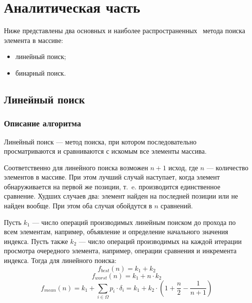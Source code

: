 \chapter{Аналитическая часть}

Ниже представлены два основных и наиболее распространенных~\cite{aa_lec} метода поиска элемента в массиве:
\begin{itemize}[label=---]
	\item линейный поиск;
	\item бинарный поиск.
\end{itemize}

\section{Линейный поиск}

\subsection{Описание алгоритма}

Линейный поиск --- метод поиска, при котором последовательно просматриваются и сравниваются с искомым все элементы массива.

Соответственно для линейного поиска возможен $n+1$ исход, где $n$ --- количество элементов в массиве. При этом лучший случай наступает, когда элемент обнаруживается на первой же позиции, т.~e. производится единственное сравнение. Худших случаев два: элемент найден на последней позиции или не найден вообще. При этом оба случая обойдутся в $n$ сравнений.

Пусть $k_1$ --- число операций производимых линейным поиском до прохода по всем элементам, например, объявление и определение начального значения индекса. Пусть также $k_2$ --- число операций производимых на каждой итерации просмотра очередного элемента, например, операции сравнения и инкремента индекса. Тогда для линейного поиска:
\begin{equation}
	\label{eq:lin_best_case}
	f_{best}(n) = k_1 + k_2
\end{equation}
\begin{equation}
	\label{eq:lin_worst_case}
	f_{worst}(n) = k_1 + n \cdot k_2
\end{equation}
\begin{equation}
	\label{eq:lin_standart_case}
	f_{mean}(n) = k_1 + \displaystyle\sum_{i\in\Omega}^{} p_i \cdot \delta_i = k_1 + k_2 \cdot (1 + \frac{n}{2} - \frac{1}{n + 1})
\end{equation}

